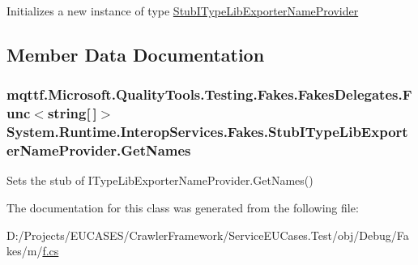 Initializes a new instance of type \hyperlink{class_system_1_1_runtime_1_1_interop_services_1_1_fakes_1_1_stub_i_type_lib_exporter_name_provider}{Stub\-I\-Type\-Lib\-Exporter\-Name\-Provider}



\subsection{Member Data Documentation}
\hypertarget{class_system_1_1_runtime_1_1_interop_services_1_1_fakes_1_1_stub_i_type_lib_exporter_name_provider_a4bb21c4d5ffef2d7cfbd2952f8c563d3}{
\subsubsection[{Get\-Names}]{\setlength{\rightskip}{0pt plus 5cm}mqttf.\-Microsoft.\-Quality\-Tools.\-Testing.\-Fakes.\-Fakes\-Delegates.\-Func$<$string\mbox{[}$\,$\mbox{]}$>$ System.\-Runtime.\-Interop\-Services.\-Fakes.\-Stub\-I\-Type\-Lib\-Exporter\-Name\-Provider.\-Get\-Names}}\label{class_system_1_1_runtime_1_1_interop_services_1_1_fakes_1_1_stub_i_type_lib_exporter_name_provider_a4bb21c4d5ffef2d7cfbd2952f8c563d3}


Sets the stub of I\-Type\-Lib\-Exporter\-Name\-Provider.\-Get\-Names()



The documentation for this class was generated from the following file\-:\begin{DoxyCompactItemize}
\item 
D\-:/\-Projects/\-E\-U\-C\-A\-S\-E\-S/\-Crawler\-Framework/\-Service\-E\-U\-Cases.\-Test/obj/\-Debug/\-Fakes/m/\hyperlink{m_2f_8cs}{f.\-cs}\end{DoxyCompactItemize}
